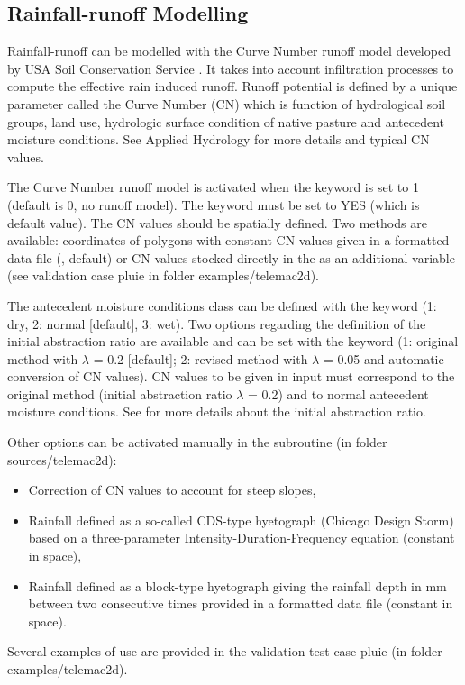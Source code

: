 \subsection{Rainfall-runoff Modelling}

Rainfall-runoff can be modelled with the Curve Number runoff model developed
by USA Soil Conservation Service \cite{soil1972national}. It takes into 
account infiltration processes to compute the effective rain induced runoff.
Runoff potential is defined by a unique parameter called the Curve Number (CN)
which is function of hydrological soil groups, land use, hydrologic surface
condition of native pasture and antecedent moisture conditions.
See Applied Hydrology \citep{chow1988mays} 
for more details and typical CN values. 

The Curve Number runoff model is activated when the keyword
 is set to 1 (default is 0, no runoff model).
The keyword  must be set to YES (which is default value).
The CN values should be spatially defined.
Two methods are available: coordinates of polygons with constant CN values
given in a formatted data file (, default)
or CN values stocked directly in the  as
an additional variable (see validation case pluie in folder examples/telemac2d).

The antecedent moisture conditions class can be defined with the keyword
 (1: dry, 2: normal [default], 3: wet).
Two options regarding the definition of the initial abstraction ratio are
available
and can be set with the keyword 
(1: original method with $\lambda$ = 0.2 [default];
 2: revised method with $\lambda$ = 0.05 and automatic conversion of CN values).
CN values to be given in input must correspond to the original method
(initial abstraction ratio $\lambda$ = 0.2) and to normal antecedent moisture
conditions. See \cite{woodward2003runoff} for more details about the initial
abstraction ratio.

Other options can be activated manually in the 
subroutine (in folder sources/telemac2d):
\begin{itemize}
\item Correction of CN values to account for steep slopes,
\item Rainfall defined as a so-called CDS-type hyetograph (Chicago Design
Storm) based on a three-parameter Intensity-Duration-Frequency equation
(constant in space),
\item Rainfall defined as a block-type hyetograph giving the rainfall depth
in mm between two consecutive times provided in a formatted data file (constant
in space).
\end{itemize}
Several examples of use are provided in the validation test case pluie
(in folder examples/telemac2d).


